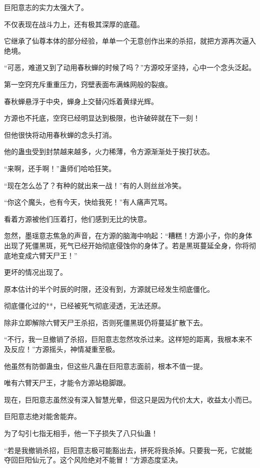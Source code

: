 
\begin{this_body}

巨阳意志的实力太强大了。

不仅表现在战斗力上，还有极其深厚的底蕴。

它继承了仙尊本体的部分经验，单单一个无意创作出来的杀招，就把方源再次逼入绝境。

“可恶，难道又到了动用春秋蝉的时候了吗？”方源咬牙坚持，心中一个念头泛起。

第一空窍充斥重重压力，窍壁表面布满蛛网般的裂痕。

春秋蝉悬浮于中央，蝉身上交替闪烁着黄绿光辉。

方源也不托底，空窍已经明显达到极限，也许破碎就在下一刻！

但他很快将动用春秋蝉的念头打消。

他的蛊虫受到封禁越来越多，火力稀薄，令方源渐渐处于挨打状态。

“来啊，还手啊！”蛊师们哈哈狂笑。

“现在怎么怂了？有种的就出来一战！”有的人则丝丝冷笑。

“你这个魔头，也有今天，快给我死！”有人痛声咒骂。

看着方源被他们压着打，他们感到无比的快意。

忽然，墨瑶意志焦急的声音，在方源的脑海中响起：“糟糕！方源小子，你的身体出现了死僵黑斑，死气已经开始彻底侵蚀你的身体了。若是黑斑蔓延全身，你将彻底地变成六臂天尸王！”

更坏的情况出现了。

原本估计的半个时辰的时限，还没有到，方源就已经发生彻底僵化。

彻底僵化过的**，已经被死气彻底浸透，无法还原。

除非立即解除六臂天尸王杀招，否则死僵黑斑仍将蔓延扩散下去。

“不行，我一旦撤销了杀招，巨阳意志忽然攻杀过来。这样短的距离，我根本来不及反应！”方源摇头，神情凝重至极。

他虽然有防御蛊虫，但这些凡蛊在巨阳意志面前，根本不值一提。

唯有六臂天尸王，才能令方源站稳脚跟。

现在，巨阳意志虽然没有深入智慧光晕，但这只是因为代价太大，收益太小而已。

巨阳意志绝对能舍能弃。

为了勾引七指无相手，他一下子损失了八只仙蛊！

“若是我撤销杀招，巨阳意志极可能豁出去，拼死将我杀掉。只要我一死，它就能夺回巨阳仙元了。这个风险绝对不能冒！”方源态度坚决。


\end{this_body}
